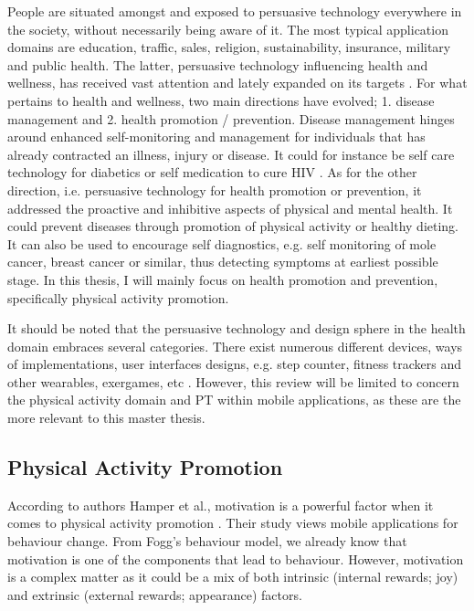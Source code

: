 People are situated amongst and exposed to persuasive technology everywhere in the society, without necessarily being aware of it. The most typical application domains are education, traffic, sales, religion, sustainability, insurance, military and public health. The latter, persuasive technology influencing health and wellness, has received vast attention and lately expanded on its targets \cite{orji_persuasive_2018}.
For what pertains to health and wellness, two main directions have evolved; 1. disease management and 2. health promotion / prevention. Disease management hinges around enhanced self-monitoring and management for individuals that has already contracted an illness, injury or disease. It could for instance be self care technology for diabetics \cite{rouyard_nudging_2018}
or self medication to cure HIV \cite{schnall_mhealth_2015}.
As for the other direction, i.e. persuasive technology for health promotion or prevention, it addressed the proactive and inhibitive aspects of physical and mental health. It could prevent diseases through promotion of physical activity or healthy dieting. It can also be used to encourage self diagnostics, e.g. self monitoring of mole cancer, breast cancer or similar, thus detecting symptoms at earliest  possible stage. In this thesis, I will mainly focus on health promotion and prevention, specifically physical activity promotion. 

It should be noted that the persuasive technology and design sphere in the health domain embraces several categories. There exist numerous different devices, ways of implementations, user interfaces designs, e.g. step counter, fitness trackers and other wearables, exergames, etc \cite{maitland_technological_2009}.
However, this review will be limited to concern the physical activity domain and PT within mobile applications, as these are the more relevant to this master thesis. 

\subsection{Physical Activity Promotion}
According to authors Hamper et al., motivation is a powerful factor when it comes to physical activity promotion \cite{hamper_behavior_2016}.
Their study views mobile applications for behaviour change. From Fogg's behaviour model, we already know that motivation is one of the components that lead to behaviour. However, motivation is a complex matter as it could be a mix of both intrinsic (internal rewards; joy) and extrinsic (external rewards; appearance) factors. 

